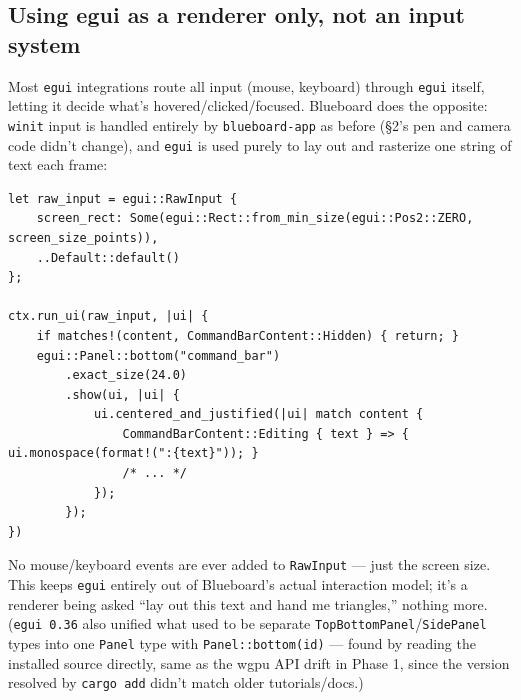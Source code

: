 \documentclass[11pt]{article}
\begin{document}
\subsection{Using egui as a renderer only, not an input system}
Most \texttt{egui} integrations route all input (mouse, keyboard) through \texttt{egui}
itself, letting it decide what's hovered/clicked/focused. Blueboard does the opposite:
\texttt{winit} input is handled entirely by \texttt{blueboard-app} as before (\S2's pen
and camera code didn't change), and \texttt{egui} is used purely to lay out and rasterize
one string of text each frame:
\begin{lstlisting}
let raw_input = egui::RawInput {
    screen_rect: Some(egui::Rect::from_min_size(egui::Pos2::ZERO, screen_size_points)),
    ..Default::default()
};

ctx.run_ui(raw_input, |ui| {
    if matches!(content, CommandBarContent::Hidden) { return; }
    egui::Panel::bottom("command_bar")
        .exact_size(24.0)
        .show(ui, |ui| {
            ui.centered_and_justified(|ui| match content {
                CommandBarContent::Editing { text } => { ui.monospace(format!(":{text}")); }
                /* ... */
            });
        });
})
\end{lstlisting}
No mouse/keyboard events are ever added to \texttt{RawInput} — just the screen size. This
keeps \texttt{egui} entirely out of Blueboard's actual interaction model; it's a renderer
being asked ``lay out this text and hand me triangles,'' nothing more. (\texttt{egui 0.36}
also unified what used to be separate \texttt{TopBottomPanel}/\texttt{SidePanel} types into
one \texttt{Panel} type with \texttt{Panel::bottom(id)} — found by reading the installed
source directly, same as the wgpu API drift in Phase 1, since the version resolved by
\texttt{cargo add} didn't match older tutorials/docs.)
\end{document}
